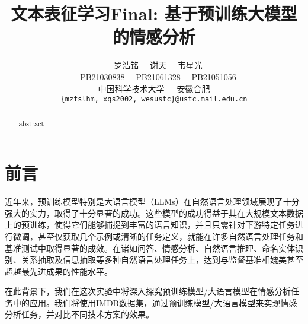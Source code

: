 \documentclass{article}
\title{文本表征学习Final: 基于预训练大模型的情感分析}
\author{
~~{\large 罗浩铭\quad}
~~{\large 谢天\quad}
~~{\large 韦星光\quad}\\
~~{PB21030838}
~~{PB21061328}
~~{PB21051056}\\
中国科学技术大学\ \ \ 安徽合肥\\
{\tt \{mzfslhm, xqs2002, wesustc\}@ustc.mail.edu.cn} \\
}
\begin{document}
\maketitle


\begin{abstract}
  abstract
\end{abstract}







\section{前言}
近年来，预训练模型特别是大语言模型（LLMs）在自然语言处理领域展现了十分强大的实力，取得了十分显著的成功。这些模型的成功得益于其在大规模文本数据上的预训练，使得它们能够捕捉到丰富的语言知识，并且只需针对下游特定任务进行微调，甚至仅获取几个示例或清晰的任务定义，就能在许多自然语言处理任务和基准测试中取得显著的成效。在诸如问答、情感分析、自然语言推理、命名实体识别、关系抽取及信息抽取等多种自然语言处理任务上，达到与监督基准相媲美甚至超越最先进成果的性能水平。

在此背景下，我们在这次实验中将深入探究预训练模型/大语言模型在情感分析任务中的应用。我们将使用IMDB数据集，通过预训练模型/大语言模型来实现情感分析任务，并对比不同技术方案的效果。
\end{document}
